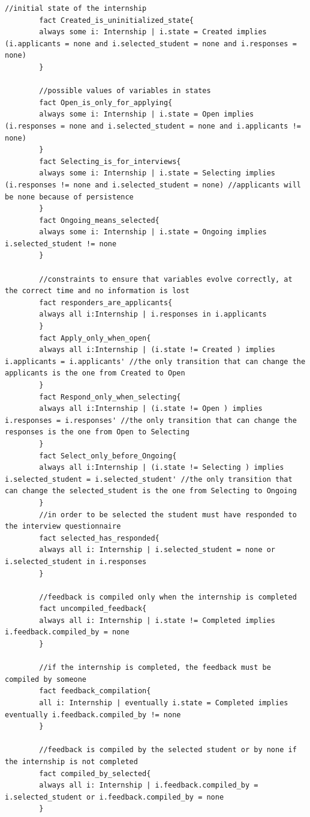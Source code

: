 \begin{lstlisting}[language=Alloy]
        //initial state of the internship
        fact Created_is_uninitialized_state{
        always some i: Internship | i.state = Created implies (i.applicants = none and i.selected_student = none and i.responses = none)
        }
        
        //possible values of variables in states
        fact Open_is_only_for_applying{
        always some i: Internship | i.state = Open implies (i.responses = none and i.selected_student = none and i.applicants != none)
        }
        fact Selecting_is_for_interviews{
        always some i: Internship | i.state = Selecting implies (i.responses != none and i.selected_student = none) //applicants will be none because of persistence
        }
        fact Ongoing_means_selected{
        always some i: Internship | i.state = Ongoing implies i.selected_student != none
        }
        
        //constraints to ensure that variables evolve correctly, at the correct time and no information is lost
        fact responders_are_applicants{
        always all i:Internship | i.responses in i.applicants
        }
        fact Apply_only_when_open{
        always all i:Internship | (i.state != Created ) implies i.applicants = i.applicants' //the only transition that can change the applicants is the one from Created to Open
        }
        fact Respond_only_when_selecting{
        always all i:Internship | (i.state != Open ) implies i.responses = i.responses' //the only transition that can change the responses is the one from Open to Selecting
        }
        fact Select_only_before_Ongoing{
        always all i:Internship | (i.state != Selecting ) implies i.selected_student = i.selected_student' //the only transition that can change the selected_student is the one from Selecting to Ongoing
        }
        //in order to be selected the student must have responded to the interview questionnaire
        fact selected_has_responded{
        always all i: Internship | i.selected_student = none or i.selected_student in i.responses
        }
        
        //feedback is compiled only when the internship is completed
        fact uncompiled_feedback{
        always all i: Internship | i.state != Completed implies i.feedback.compiled_by = none
        }
        
        //if the internship is completed, the feedback must be compiled by someone
        fact feedback_compilation{
        all i: Internship | eventually i.state = Completed implies eventually i.feedback.compiled_by != none
        }
        
        //feedback is compiled by the selected student or by none if the internship is not completed
        fact compiled_by_selected{
        always all i: Internship | i.feedback.compiled_by = i.selected_student or i.feedback.compiled_by = none
        }
\end{lstlisting}


